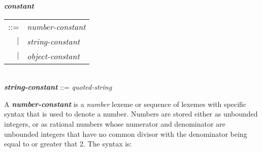 \documentclass[12pt]{article}
\newcommand{\emkey}[1]{{\em \bfseries #1}}
\newenvironment{indpar}[1][0.3in]%
	{\begin{list}{}%
		     {\setlength{\itemsep}{0in}%
		      \setlength{\topsep}{0in}%
		      \setlength{\parsep}{1ex}%
		      \setlength{\labelwidth}{#1}%
		      \setlength{\leftmargin}{#1}%
		      \addtolength{\leftmargin}{\labelsep}}%
	 \item}%
	{\end{list}}
\begin{document}
\begin{indpar}
\emkey{constant}
    \begin{tabular}[t]{rl}
    ::= & {\em number-constant} \\
    $|$ & {\em string-constant} \\
    $|$ & {\em object-constant} \\
    \end{tabular} \\
\emkey{string-constant} ::= {\em quoted-string}
\end{indpar}

A \emkey{number-constant} is a {\em number} lexeme or sequence of
lexemes with specific syntax
that is used to denote a number.  Numbers are stored either
as unbounded integers, or as rational numbers whose numerator
and denominator are unbounded integers that have no common divisor
with the denominator being equal to or greater that 2.  The syntax is:
\end{document}
